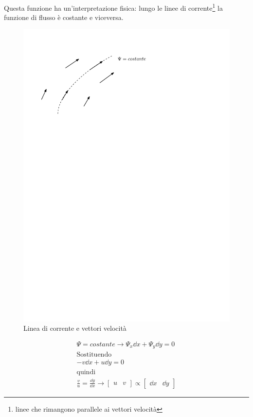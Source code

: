 Questa funzione ha un'interpretazione fisica: lungo le linee di corrente\footnote{linee che rimangono parallele ai vettori velocità} la funzione di flusso è costante e viceversa.

%
	\begin{figure}[ht]
		\includegraphics[scale=0.9]{./3.5 Equazioni di Navier-Stokes/3.5-1}
		\centering
		\caption{Linea di corrente e vettori velocità}
	\end{figure}
%

\begin{equation*}
	\begin{gathered}
		\Psi = costante \rightarrow \Psi_x \dd{x} + \Psi_y \dd{y} = 0\\
		\text{Sostituendo}\\
		- v \dd{x} + u \dd{y} = 0\\
		\text{quindi}\\
		\frac{v}{u} = \frac{\dd{y}}{\dd{x}} \rightarrow \begin{bmatrix} u & v \end{bmatrix} \propto  \begin{bmatrix} \dd{x} & \dd{y} \end{bmatrix}
	\end{gathered}
\end{equation*}


